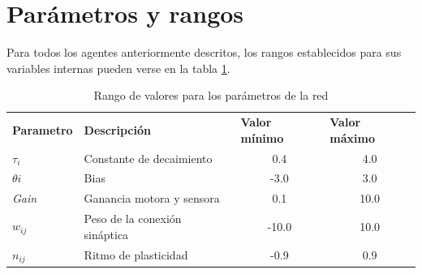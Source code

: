 \section{Parámetros y rangos}
Para todos los agentes anteriormente descritos, los rangos establecidos para sus variables internas pueden verse en la tabla \ref{table:tablaValoresParametros}.
\begin{table}[H]
\centering
\begin{tabular}{l|l|c|c}
\textbf{Parametro} & \textbf{Descripción}          & \multicolumn{1}{l|}{\textbf{Valor mínimo}} & \multicolumn{1}{l}{\textbf{Valor máximo}} \\
\textit{$\tau_{i}$}       & Constante de decaimiento      & 0.4                                        & 4.0                                       \\
\textit{$\theta{i}$}      & Bias                          & -3.0                                       & 3.0                                       \\
\textit{Gain}      & Ganancia motora y sensora     & 0.1                                        & 10.0                                      \\
\textit{$w_{ij}$}      & Peso de la conexión sináptica & -10.0                                      & 10.0                                      \\
\textit{$n_{ij}$}     & Ritmo de plasticidad          & -0.9                                       & 0.9
\end{tabular}
\caption{Rango de valores para los parámetros de la red}
 \label{table:tablaValoresParametros}
\end{table}
